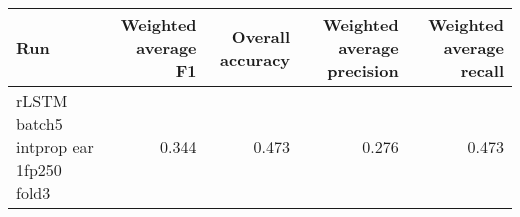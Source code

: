 \begin{tabular}{lrrrr}
\toprule
Run & Weighted average F1 & Overall accuracy & Weighted average precision & Weighted average recall \\
\midrule
rLSTM batch5 intprop ear 1fp250 fold3 & 0.344 & 0.473 & 0.276 & 0.473 \\
\bottomrule
\end{tabular}
